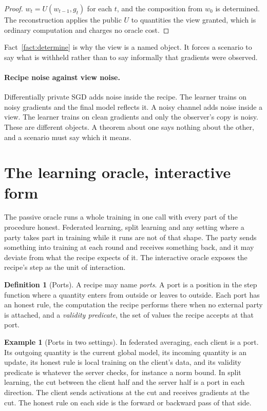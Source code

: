 \documentclass[11pt]{article}
\theoremstyle{definition}
\newtheorem{definition}{Definition}
\newtheorem{example}{Example}
\theoremstyle{plain}
\theoremstyle{remark}
\begin{document}
\begin{proof}
$w_t = U(w_{t-1}, g_t)$ for each $t$, and the composition from $w_0$ is
determined. The reconstruction applies the public $U$ to quantities the view
granted, which is ordinary computation and charges no oracle cost.
\end{proof}

Fact~\ref{fact:determine} is why the view is a named object. It forces a scenario
to say what is withheld rather than to say informally that gradients were observed.

\paragraph{Recipe noise against view noise.} Differentially private SGD adds noise
inside the recipe. The learner trains on noisy gradients and the final model
reflects it. A noisy channel adds noise inside a view. The learner trains on clean
gradients and only the observer's copy is noisy. These are different objects. A
theorem about one says nothing about the other, and a scenario must say which it
means.

\section{The learning oracle, interactive form}
\label{sec:interactive}

The passive oracle runs a whole training in one call with every part of the
procedure honest. Federated learning, split learning and any setting where a party
takes part in training while it runs are not of that shape. The party sends
something into training at each round and receives something back, and it may
deviate from what the recipe expects of it. The interactive oracle exposes the
recipe's step as the unit of interaction.

\begin{definition}[Ports]
\label{def:port}
A recipe may name \emph{ports}. A port is a position in the step function where a
quantity enters from outside or leaves to outside. Each port has an honest rule,
the computation the recipe performs there when no external party is attached, and
a \emph{validity predicate}, the set of values the recipe accepts at that port.
\end{definition}

\begin{example}[Ports in two settings]
In federated averaging, each client is a port. Its outgoing quantity is the current
global model, its incoming quantity is an update, its honest rule is local training
on the client's data, and its validity predicate is whatever the server checks,
for instance a norm bound. In split learning, the cut between the client half and
the server half is a port in each direction. The client sends activations at the
cut and receives gradients at the cut. The honest rule on each side is the forward
or backward pass of that side.
\end{example}
\end{document}

